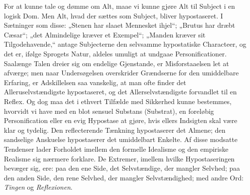 \documentclass[12pt]{book}
\newcommand{\opage}[1]{\marginnote{\footnotesize\textit{[#1]}}}
\begin{document}
\opage{182} For at kunne tale og dømme om Alt, maae vi kunne gjøre Alt til Subject i en logisk Dom.
Men Alt, hvad der sættes som Subject, bliver hypostaseret. I Sætninger som disse: „Stenen
har slaaet Mennesket ihjel“; „Brutus har dræbt Cæsar“; „det Almindelige kræver et
Exempel“; „Manden kræver sit Tilgodehavende,“ antage Subjecterne den selvsamme
hypostatiske Characteer, og det er, ifølge Sprogets Natur, aldeles umuligt at undgaae
Personificationer. Saalænge Talen dreier sig om endelige Gjenstande, er Misforstaaelsen
let at afværge; men naar Undersøgelsen overskrider Grændserne for den umiddelbare
Erfaring, er Adskillelsen saa vanskelig, at man ofte finder det Alleruselvstændigste
hypostaseret, og det Allerselvstændigste forvandlet til en Reflex. Og dog maa det i
ethvert Tilfælde med Sikkerhed kunne bestemmes, hvorvidt vi have med en blot sensuel
Substans (Substrat), en foreløbig Personification eller en evig Hypostase at gjøre, hvis
%
ellers Indsigten skal være klar og tydelig. Den reflecterende Tænkning hypostaserer det
Almene; den sandselige Anskuelse hypostaserer det umiddelbart Enkelte. Af disse modsatte
Tendenser lader Forholdet imellem den formelle Idealisme og den empiriske Realisme sig
nærmere forklare. De Extremer, imellem hvilke Hypostaseringen bevæger sig, ere: paa den
ene Side, det Selvstændige, der mangler Selvhed; paa den anden Side, den rene Selvhed,
der mangler Selvstændighed; med andre Ord: \emph{Tingen} og \emph{Reflexionen}.
\end{document}

